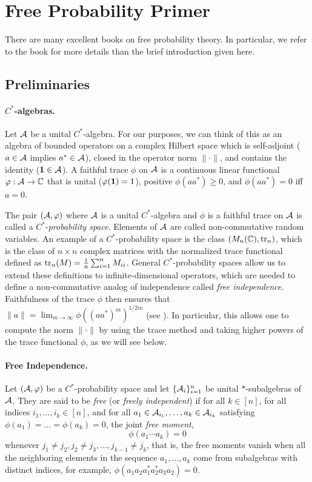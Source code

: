 \section{Free Probability Primer}
\label{sec:app}

There are many excellent books on free probability theory. In particular, we refer to the book \cite{NS06} for more details than the brief introduction given here.

\subsection{Preliminaries}
\label{sec:free}



\paragraph{$C^*$-algebras.} Let $\mathcal A$ be a unital $C^*$-algebra. For our purposes, we can think of this as an algebra of bounded operators on a complex Hilbert space which is self-adjoint ($a \in \mathcal A$
 implies $a^* \in \mathcal A$), closed in the operator norm $\|\cdot\|$, and contains the identity ($\boldsymbol{1} \in \mathcal A$). A faithful trace $\phi$ on $\mathcal A$ is a continuous linear functional $\varphi: \mathcal A \to \mathbb{C}$ that is  unital ($\varphi(\boldsymbol{1})=1$), positive $\phi(aa^*) \ge 0$, and $\phi(aa^*) = 0$ iff $a=0$. 
 
 The pair $(\mathcal A, \varphi)$ where $\mathcal A$ is a unital $C^*$-algebra and $\phi$ is a faithful trace on $\mathcal A$ is called a $C^*$-\emph{probability space}. Elements of $\mathcal A$ are called non-commutative random variables. An example of a $C^*$-probability space is the class $(M_n(\mathbb{C}), \mathrm{tr}_n)$, which is the class of $n \times n$ complex matrices with the normalized trace  functional defined as $\mathrm{tr}_n(M) = \frac{1}{n} \sum_{i=1}^n {M_{ii}}$. General $C^*$-probability spaces allow us to extend these definitions to infinite-dimensional operators, which are needed to define a non-commutative analog of independence called \emph{free independence}. Faithfulness of the trace $\phi$ then ensures that $\|a\|= \lim_{m \to \infty} \phi((aa^*)^m)^{1/2m}$ (see \cite[Proposition 3.17]{NS06}). In particular, this allows one to compute the norm $\|\cdot\|$ by using the trace method and taking higher powers of the trace functional $\phi$, as we will see below.


\paragraph{Free Independence.} Let $(\mathcal A, \varphi)$ be a $C^*$-probability space and let $\{\mathcal A_i\}_{i=1}^n$ be unital $*$-subalgebras of  $\mathcal A$. They are said to be \emph{free} (or \emph{freely independent}) if for all $k \in [n]$, for all indices $i_1, \ldots, i_k \in [n]$, and for all $a_1 \in \mathcal A_{i_1}, \ldots, a_k \in \mathcal A_{i_k}$ satisfying $\phi(a_1)=\ldots =\phi(a_k)=0$, the joint \emph{free moment},
\[ \phi(a_1 \cdots a_k) = 0\]
whenever $j_1 \neq j_2, j_2\neq j_3, \ldots, j_{k-1} \neq j_k$, that is, the free moments vanish when all the neighboring elements in the sequence $a_1, \ldots, a_k$ come from  subalgebras with distinct indices, for example, $\phi(a_1a_2a^*_1a^*_2a_3a_2)=0$.

